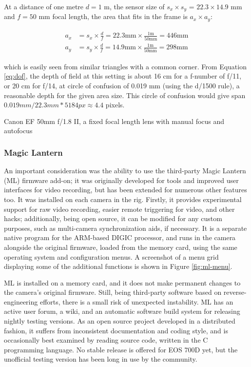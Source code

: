 At a distance of one metre $d = 1$ m, the sensor size of $s_x \times s_y$ = $22.3 \times 14.9$ mm and $f = 50$ mm focal length, the area that fits in the frame is $a_x \times a_y$:

\begin{align} \label{equ:areasize} \begin{split}
	a_x &= s_x \times \frac{d}{f} = 22.3 \text{mm} \times \frac{1 \text{m}}{50 \text{mm}} = 446 \text{mm}\\
	a_y &= s_y \times \frac{d}{f} = 14.9 \text{mm} \times \frac{1 \text{m}}{50 \text{mm}} = 298 \text{mm}
\end{split} \end{align}

which is easily seen from similar triangles with a common corner.
From Equation \ref{eq:dof}, the depth of field at this setting is about 16 cm for a f-number of f/11, or 20 cm for f/14, at circle of confusion of 0.019 mm (using the d/1500 rule), a reasonable depth for the given area size.
This circle of confusion would give span $0.019 mm / 22.3 mm * 5184 px \approx 4.4$ pixels.

{Canon EF 50mm f/1.8 II, a fixed focal length lens with manual focus and autofocus}

\subsubsection{Magic Lantern}

An important consideration was the ability to use the third-party Magic Lantern (ML) firmware add-on;
it was originally developed for tools and improved user interfaces for video recording, but has been extended for numerous other features too.
It was installed on each camera in the rig.
Firstly, it provides experimental support for raw video recording, easier remote triggering for video, and other hacks;
additionally, being open source, it can be modified for any custom purposes, such as multi-camera synchronization aids, if necessary.
It is a separate native program for the ARM-based DIGIC processor, and runs in the camera alongside the original firmware, loaded from the memory card, using the same operating system and configuration menus. \cite{magiclantern}
A screenshot of a menu grid displaying some of the additional functions is shown in Figure \ref{fig:ml-menu}.

ML is installed on a memory card, and it does not make permanent changes to the camera's original firmware.
Still, being third-party software based on reverse-engineering efforts, there is a small risk of unexpected instability.
ML has an active user forum, a wiki, and an automatic software build system for releasing nightly testing versions.
As an open source project developed in a distributed fashion, it suffers from inconsistent documentation and coding style, and is occasionally best examined by reading source code, written in the C programming language.
No stable release is offered for EOS 700D yet, but the unofficial testing version has been long in use by the community. \cite{magiclantern}

